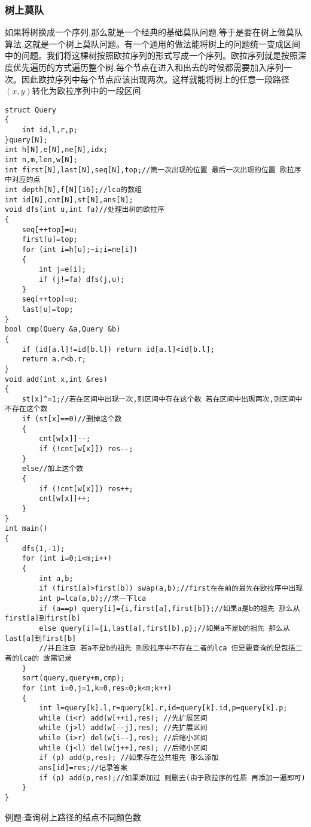 \documentclass[a4paper]{ctexart}
\begin{document}
\subsubsection{树上莫队}
如果将树换成一个序列,那么就是一个经典的基础莫队问题,等于是要在树上做莫队算法,这就是一个树上莫队问题。有一个通用的做法能将树上的问题统一变成区间中的问题。我们将这棵树按照欧拉序列的形式写成一个序列。欧拉序列就是按照深度优先遍历的方式遍历整个树,每个节点在进入和出去的时候都需要加入序列一次。因此欧拉序列中每个节点应该出现两次。这样就能将树上的任意一段路径$(x,y)$转化为欧拉序列中的一段区间
\begin{lstlisting}
struct Query
{
    int id,l,r,p;
}query[N];
int h[N],e[N],ne[N],idx;
int n,m,len,w[N];
int first[N],last[N],seq[N],top;//第一次出现的位置 最后一次出现的位置 欧拉序中对应的点
int depth[N],f[N][16];//lca的数组
int id[N],cnt[N],st[N],ans[N];
void dfs(int u,int fa)//处理出树的欧拉序
{
    seq[++top]=u;
    first[u]=top;
    for (int i=h[u];~i;i=ne[i])
    {
        int j=e[i];
        if (j!=fa) dfs(j,u);
    }
    seq[++top]=u;
    last[u]=top;
}
bool cmp(Query &a,Query &b)
{
    if (id[a.l]!=id[b.l]) return id[a.l]<id[b.l];
    return a.r<b.r;
}
void add(int x,int &res)
{
    st[x]^=1;//若在区间中出现一次,则区间中存在这个数 若在区间中出现两次,则区间中不存在这个数
    if (st[x]==0)//删掉这个数
    {
        cnt[w[x]]--;
        if (!cnt[w[x]]) res--;
    }
    else//加上这个数
    {
        if (!cnt[w[x]]) res++;
        cnt[w[x]]++;
    }
}
int main()
{
    dfs(1,-1);
    for (int i=0;i<m;i++)
    {
        int a,b;
        if (first[a]>first[b]) swap(a,b);//first在在前的最先在欧拉序中出现
        int p=lca(a,b);//求一下lca
        if (a==p) query[i]={i,first[a],first[b]};//如果a是b的祖先 那么从first[a]到first[b]
        else query[i]={i,last[a],first[b],p};//如果a不是b的祖先 那么从last[a]到first[b]
        //并且注意 若a不是b的祖先 则欧拉序中不存在二者的lca 但是要查询的是包括二者的lca的 故需记录
    }
    sort(query,query+m,cmp);
    for (int i=0,j=1,k=0,res=0;k<m;k++)
    {
        int l=query[k].l,r=query[k].r,id=query[k].id,p=query[k].p;
        while (i<r) add(w[++i],res); //先扩展区间
        while (j>l) add(w[--j],res); //先扩展区间
        while (i>r) del(w[i--],res); //后缩小区间
        while (j<l) del(w[j++],res); //后缩小区间
        if (p) add(p,res); //如果存在公共祖先 那么添加
        ans[id]=res;//记录答案
        if (p) add(p,res);//如果添加过 则删去(由于欧拉序的性质 再添加一遍即可)
    }
}
\end{lstlisting}
例题:查询树上路径的结点不同颜色数
\end{document}

